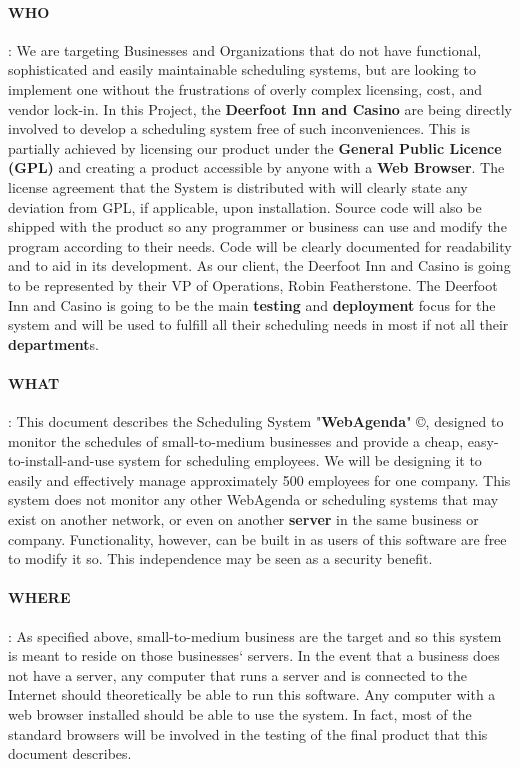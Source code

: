 \documentclass[letterpaper,12pt]{report}
\begin{document}
\paragraph*{WHO  }: We are targeting Businesses and Organizations that do not have functional, sophisticated and easily maintainable scheduling systems, but are looking to implement one without the frustrations of overly complex licensing, cost, and vendor lock-in. In this Project, the \textbf{Deerfoot Inn and Casino} are being directly involved to develop a scheduling system free of such inconveniences. This is partially achieved by licensing our product under the \textbf{General Public Licence (GPL)} and creating a product accessible by anyone with a \textbf{Web Browser}. The license agreement that the System is distributed with will clearly state any deviation from GPL, if applicable, upon installation. Source code will also be shipped with the product so any programmer or business can use and modify the program according to their needs. Code will be clearly documented for readability and to aid in its development. As our client, the Deerfoot Inn and Casino is going to be represented by their VP of Operations, Robin Featherstone. The Deerfoot Inn and Casino is going to be the main \textbf{testing} and \textbf{deployment} focus for the system and will be used to fulfill all their scheduling needs in most if not all their \textbf{department}s.
\pagebreak
\paragraph{WHAT }: This document describes the Scheduling System "\textbf{WebAgenda}" ©, designed to monitor the schedules of small-to-medium businesses and provide a cheap, easy-to-install-and-use system for scheduling employees. We will be designing it to easily and effectively manage approximately 500 employees for one company. This system does not monitor any other WebAgenda or scheduling systems that may exist on another network, or even on another \textbf{server} in the same business or company. Functionality, however, can be built in as users of this software are free to modify it so. This independence may be seen as a security benefit.
\paragraph{WHERE}: As specified above, small-to-medium business are the target and so this system is meant to reside on those businesses` servers. In the event that a business does not have a server, any computer that runs a server and is connected to the Internet should theoretically be able to run this software. Any computer with a web browser installed should be able to use the system. In fact, most of the standard browsers will be involved in the testing of the final product that this document describes.
\end{document}
